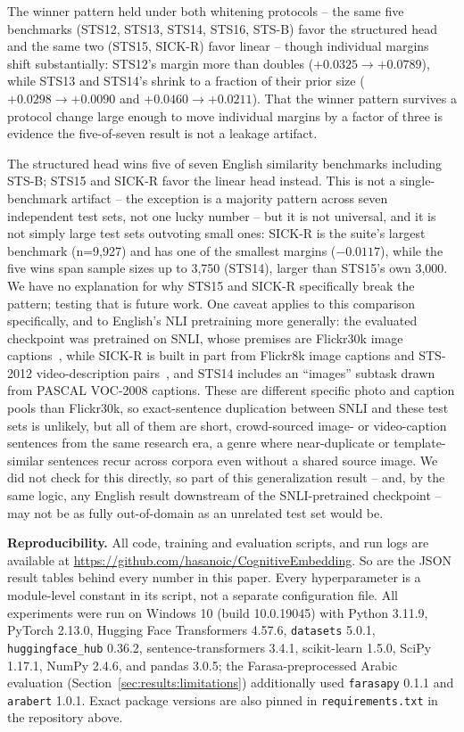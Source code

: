 \documentclass[manuscript]{acmart}
\begin{document}
The winner pattern held under both whitening protocols -- the same five benchmarks (STS12, STS13, STS14, STS16, STS-B) favor the structured head and the same two (STS15, SICK-R) favor linear -- though individual margins shift substantially: STS12's margin more than doubles ($+0.0325\to+0.0789$), while STS13 and STS14's shrink to a fraction of their prior size ($+0.0298\to+0.0090$ and $+0.0460\to+0.0211$). That the winner pattern survives a protocol change large enough to move individual margins by a factor of three is evidence the five-of-seven result is not a leakage artifact.

The structured head wins five of seven English similarity benchmarks including STS-B; STS15 and SICK-R favor the linear head instead. This is not a single-benchmark artifact -- the exception is a majority pattern across seven independent test sets, not one lucky number -- but it is not universal, and it is not simply large test sets outvoting small ones: SICK-R is the suite's largest benchmark (n=9,927) and has one of the smallest margins ($-0.0117$), while the five wins span sample sizes up to 3,750 (STS14), larger than STS15's own 3,000. We have no explanation for why STS15 and SICK-R specifically break the pattern; testing that is future work. One caveat applies to this comparison specifically, and to English's NLI pretraining more generally: the evaluated checkpoint was pretrained on SNLI, whose premises are Flickr30k image captions~\citep{bowman2015snli}, while SICK-R is built in part from Flickr8k image captions and STS-2012 video-description pairs~\citep{marelli2014sick}, and STS14 includes an ``images'' subtask drawn from PASCAL VOC-2008 captions. These are different specific photo and caption pools than Flickr30k, so exact-sentence duplication between SNLI and these test sets is unlikely, but all of them are short, crowd-sourced image- or video-caption sentences from the same research era, a genre where near-duplicate or template-similar sentences recur across corpora even without a shared source image. We did not check for this directly, so part of this generalization result -- and, by the same logic, any English result downstream of the SNLI-pretrained checkpoint -- may not be as fully out-of-domain as an unrelated test set would be.

\textbf{Reproducibility.} All code, training and evaluation scripts, and run logs are available at \url{https://github.com/hasanoic/CognitiveEmbedding}. So are the JSON result tables behind every number in this paper. Every hyperparameter is a module-level constant in its script, not a separate configuration file. All experiments were run on Windows 10 (build 10.0.19045) with Python 3.11.9, PyTorch 2.13.0, Hugging Face Transformers 4.57.6, \texttt{datasets} 5.0.1, \texttt{huggingface\_hub} 0.36.2, sentence-transformers 3.4.1, scikit-learn 1.5.0, SciPy 1.17.1, NumPy 2.4.6, and pandas 3.0.5; the Farasa-preprocessed Arabic evaluation (Section~\ref{sec:results:limitations}) additionally used \texttt{farasapy} 0.1.1 and \texttt{arabert} 1.0.1. Exact package versions are also pinned in \texttt{requirements.txt} in the repository above.
\end{document}
